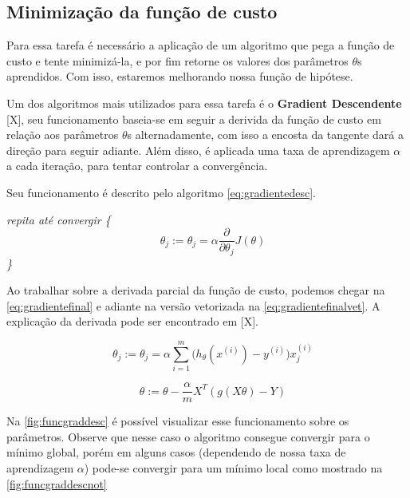 \subsection{Minimização da função de custo}

Para essa tarefa é necessário a aplicação de um algoritmo que pega a função de custo e tente minimizá-la, e por fim retorne os valores dos parâmetros $ \theta $s aprendidos. Com isso, estaremos melhorando nossa função de hipótese. 

Um dos algoritmos mais utilizados para essa tarefa é o \textbf{Gradient Descendente} [X], seu funcionamento baseia-se em seguir a derivida da função de custo em relação aos parâmetros $\theta$s alternadamente, com isso a encosta da tangente dará a direção para seguir adiante. Além disso, é aplicada uma taxa de aprendizagem $ \alpha $ a cada iteração, para tentar controlar a convergência.

Seu funcionamento é descrito pelo algoritmo \ref{eq:gradientedesc}.

\textit{repita até convergir \{}
\begin{equation}
\label{eq:gradientedesc}
\quad \theta_j := \theta_j = \alpha \frac{\partial}{\partial\theta_j} J(\theta)
\end{equation}
\textit{\quad\quad\quad \}}

Ao trabalhar sobre a derivada parcial da função de custo, podemos chegar na \autoref{eq:gradientefinal} e adiante na versão vetorizada na \autoref{eq:gradientefinalvet}. A explicação da derivada pode ser encontrado em [X].

\begin{equation}
\quad \theta_j := \theta_j = \alpha \sum\limits_{i=1}^{m}\Big(h_{\theta}(x^{(i)}) - y^{(i)} \Big) x_j^{(i)} \label{eq:gradientefinal}
\end{equation}

\begin{equation}
\quad \theta := \theta - \frac{\alpha}{m}X^T(g(X\theta) - Y) \label{eq:gradientefinalvet}
\end{equation}

Na \autoref{fig:funcgraddesc} é possível visualizar esse funcionamento sobre os parâmetros. Observe que nesse caso o algoritmo consegue convergir para o mínimo global, porém em alguns casos (dependendo de nossa taxa de aprendizagem $ \alpha $) pode-se convergir para um mínimo local como mostrado na \autoref{fig:funcgraddescnot}

